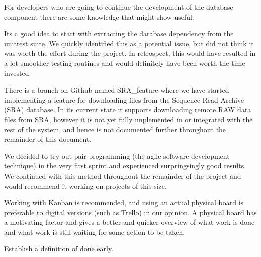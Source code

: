 For developers who are going to continue the development of the database component there are some knowledge that might show useful.

Its a good idea to start with extracting the database dependency from the unittest suite. We quickly identified this as a potential issue, but did not think it was worth the effort during the project. In retrospect, this would have resulted in a lot smoother testing routines and would definitely have been worth the time invested.

There is a branch on Github named SRA_feature where we have started implementing a feature for downloading files from the Sequence Read Archive (SRA) database. In its current state it supports downloading remote RAW data files from SRA, however it is not yet fully implemented in or integrated with the rest of the system, and hence is not documented further throughout the remainder of this document.

We decided to try out pair programming (the agile software development technique) in the very first sprint and experienced surpringsingly good results.  We continued with this method throughout the remainder of the project and would recommend it working on projects of this size.

Working with Kanban is recommended, and using an actual physical board is preferable to digital versions (such as Trello) in our opinion. A physical board has a motivating factor and gives a better and quicker overview of what work is done and what work is still waiting for some action to be taken.

Establish a definition of done early.